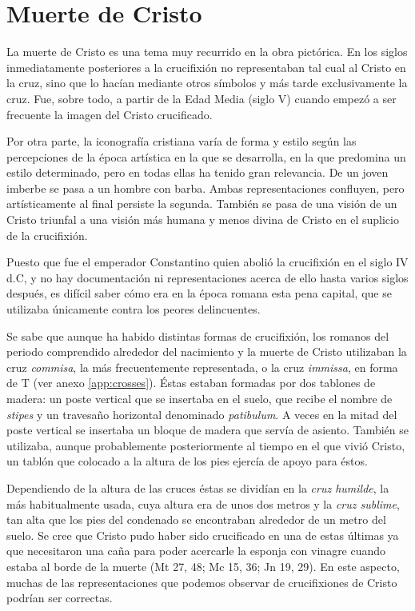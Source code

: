 \section{Muerte de Cristo}
La muerte de Cristo es una tema muy recurrido en la obra pictórica. En los siglos inmediatamente posteriores a la crucifixión no representaban tal cual al Cristo en la cruz, sino que lo hacían mediante otros símbolos y más tarde exclusivamente la cruz. Fue, sobre todo, a partir de la Edad Media (siglo V) cuando empezó a ser frecuente la imagen del Cristo crucificado.

Por otra parte, la iconografía cristiana varía de forma y estilo según las percepciones de la época artística en la que se desarrolla, en la que predomina un estilo determinado, pero en todas ellas ha tenido gran relevancia. De un joven imberbe se pasa a un hombre con barba. Ambas representaciones confluyen, pero artísticamente al final persiste la segunda. También se pasa de una visión de un Cristo triunfal a una visión más humana y menos divina de Cristo en el suplicio de la crucifixión.

Puesto que fue el emperador Constantino quien abolió la crucifixión en el siglo IV d.C, y no hay documentación ni representaciones acerca de ello hasta varios siglos después, es difícil saber cómo era en la época romana esta pena capital, que se utilizaba únicamente contra los peores delincuentes.

Se sabe que aunque ha habido distintas formas de crucifixión, los romanos del periodo comprendido alrededor del nacimiento y la muerte de Cristo utilizaban la cruz \textit{commisa}, la más frecuentemente representada, o la cruz \textit{immissa}, en forma de T (ver anexo \autoref{app:crosses}). Éstas estaban formadas por dos tablones de madera: un poste vertical que se insertaba en el suelo, que recibe el nombre de \textit{stipes} y un travesaño horizontal denominado \textit{patibulum}. A veces en la mitad del poste vertical se insertaba un bloque de madera que servía de asiento. También se utilizaba, aunque probablemente posteriormente al tiempo en el que vivió Cristo, un tablón que colocado a la altura de los pies ejercía de apoyo para éstos.

Dependiendo de la altura de las cruces éstas se dividían en la \textit{cruz humilde}, la más habitualmente usada, cuya altura era de unos dos metros y la \textit{cruz sublime}, tan alta que los pies del condenado se encontraban alrededor de un metro del suelo. Se cree que Cristo pudo haber sido crucificado en una de estas últimas ya que necesitaron una caña para poder acercarle la esponja con vinagre cuando estaba al borde de la muerte (Mt 27, 48; Mc 15, 36; Jn 19, 29). En este aspecto, muchas de las representaciones que podemos observar de crucifixiones de Cristo podrían ser correctas.

